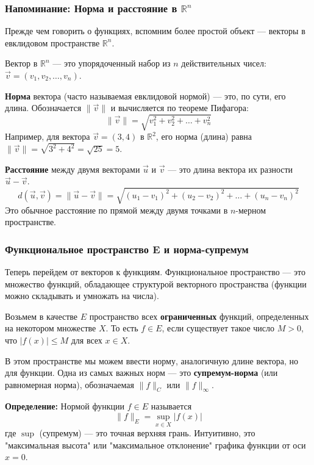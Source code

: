 \documentclass[a4paper, 12pt]{report}
\numberwithin{equation}{section}
\begin{document}
	\subsubsection{Напоминание: Норма и расстояние в $\mathbb{R}^n$}
	
	Прежде чем говорить о функциях, вспомним более простой объект — векторы в евклидовом пространстве $\mathbb{R}^n$.
	
	Вектор в $\mathbb{R}^n$ — это упорядоченный набор из $n$ действительных чисел: $\vec{v} = (v_1, v_2, \dots, v_n)$.
	
	\textbf{Норма} вектора (часто называемая евклидовой нормой) — это, по сути, его длина. Обозначается $\|\vec{v}\|$ и вычисляется по теореме Пифагора:
	$$ \|\vec{v}\| = \sqrt{v_1^2 + v_2^2 + \dots + v_n^2} $$
	Например, для вектора $\vec{v} = (3, 4)$ в $\mathbb{R}^2$, его норма (длина) равна $\|\vec{v}\| = \sqrt{3^2 + 4^2} = \sqrt{25} = 5$.
	
	\textbf{Расстояние} между двумя векторами $\vec{u}$ и $\vec{v}$ — это длина вектора их разности $\vec{u} - \vec{v}$.
	$$ d(\vec{u}, \vec{v}) = \|\vec{u} - \vec{v}\| = \sqrt{(u_1 - v_1)^2 + (u_2 - v_2)^2 + \dots + (u_n - v_n)^2} $$
	Это обычное расстояние по прямой между двумя точками в $n$-мерном пространстве.
	
	\subsubsection{Функциональное пространство E и норма-супремум}
	
	Теперь перейдем от векторов к функциям. Функциональное пространство — это множество функций, обладающее структурой векторного пространства (функции можно складывать и умножать на числа).
	
	Возьмем в качестве $E$ пространство всех \textbf{ограниченных} функций, определенных на некотором множестве $X$. То есть $f \in E$, если существует такое число $M > 0$, что $|f(x)| \le M$ для всех $x \in X$.
	
	В этом пространстве мы можем ввести норму, аналогичную длине вектора, но для функции. Одна из самых важных норм — это \textbf{супремум-норма} (или равномерная норма), обозначаемая $\|f\|_C$ или $\|f\|_{\infty}$.
	
	\textbf{Определение:} Нормой функции $f \in E$ называется
	$$ \|f\|_E = \sup_{x \in X} |f(x)| $$
	где $\sup$ (супремум) — это точная верхняя грань. Интуитивно, это "максимальная высота" или "максимальное отклонение" графика функции от оси $x=0$.
	
\end{document}

